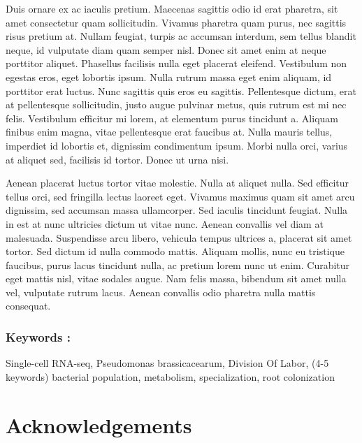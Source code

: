 \documentclass[
  11pt,
  a4paper,
]{report}
\begin{document}
Duis ornare ex ac iaculis pretium. Maecenas sagittis odio id erat
pharetra, sit amet consectetur quam sollicitudin. Vivamus pharetra quam
purus, nec sagittis risus pretium at. Nullam feugiat, turpis ac accumsan
interdum, sem tellus blandit neque, id vulputate diam quam semper nisl.
Donec sit amet enim at neque porttitor aliquet. Phasellus facilisis
nulla eget placerat eleifend. Vestibulum non egestas eros, eget lobortis
ipsum. Nulla rutrum massa eget enim aliquam, id porttitor erat luctus.
Nunc sagittis quis eros eu sagittis. Pellentesque dictum, erat at
pellentesque sollicitudin, justo augue pulvinar metus, quis rutrum est
mi nec felis. Vestibulum efficitur mi lorem, at elementum purus
tincidunt a. Aliquam finibus enim magna, vitae pellentesque erat
faucibus at. Nulla mauris tellus, imperdiet id lobortis et, dignissim
condimentum ipsum. Morbi nulla orci, varius at aliquet sed, facilisis id
tortor. Donec ut urna nisi.

Aenean placerat luctus tortor vitae molestie. Nulla at aliquet nulla.
Sed efficitur tellus orci, sed fringilla lectus laoreet eget. Vivamus
maximus quam sit amet arcu dignissim, sed accumsan massa ullamcorper.
Sed iaculis tincidunt feugiat. Nulla in est at nunc ultricies dictum ut
vitae nunc. Aenean convallis vel diam at malesuada. Suspendisse arcu
libero, vehicula tempus ultrices a, placerat sit amet tortor. Sed dictum
id nulla commodo mattis. Aliquam mollis, nunc eu tristique faucibus,
purus lacus tincidunt nulla, ac pretium lorem nunc ut enim. Curabitur
eget mattis nisl, vitae sodales augue. Nam felis massa, bibendum sit
amet nulla vel, vulputate rutrum lacus. Aenean convallis odio pharetra
nulla mattis consequat.

\subsection*{Keywords :}\label{keywords}

Single-cell RNA-seq, Pseudomonas brassicacearum, Division Of Labor, (4-5
keywords) bacterial population, metabolism, specialization, root
colonization


\chapter*{Acknowledgements}\label{acknowledgements}

\end{document}
